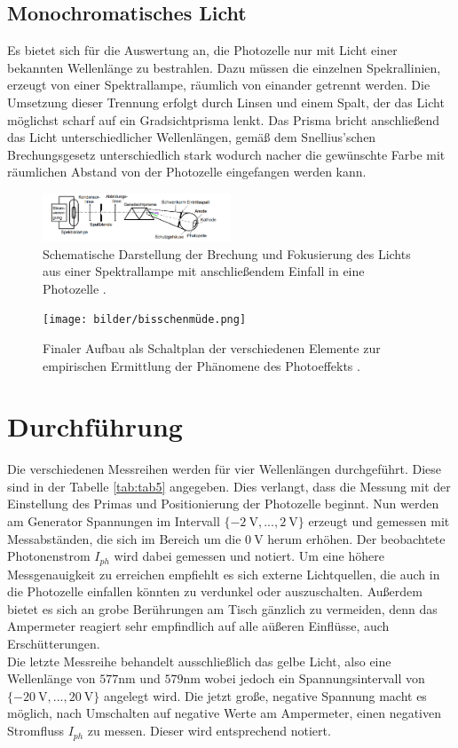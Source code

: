 \subsection{Monochromatisches Licht}
Es bietet sich für die Auswertung an, die Photozelle nur mit Licht einer bekannten Wellenlänge zu bestrahlen.
Dazu müssen die einzelnen Spekrallinien, erzeugt von einer Spektrallampe, räumlich von einander getrennt werden. 
Die Umsetzung dieser Trennung erfolgt durch Linsen und einem Spalt, der das Licht möglichst scharf auf ein Gradsichtprisma lenkt.
Das Prisma bricht anschließend das Licht unterschiedlicher Wellenlängen, gemäß dem Snellius'schen Brechungsgesetz unterschiedlich 
stark wodurch nacher die gewünschte Farbe mit räumlichen Abstand von der Photozelle eingefangen werden kann.
\begin{figure}
    \centering
    \includegraphics[width=0.5\textwidth]{bilder/licht.png}
    \caption{Schematische Darstellung der Brechung und Fokusierung des Lichts aus einer Spektrallampe mit anschließendem Einfall in eine Photozelle \cite{skript}.} 
    \label{fig:müde}
\end{figure}

\begin{figure}
    \centering
    \texttt{[image: bilder/bisschenmüde.png]}
    \caption{Finaler Aufbau als Schaltplan der verschiedenen Elemente zur empirischen Ermittlung der Phänomene des Photoeffekts \cite{skript}.} 
    \label{fig:müde}
\end{figure}
\section{Durchführung}
Die verschiedenen Messreihen werden für vier Wellenlängen durchgeführt. Diese sind in der Tabelle \ref{tab:tab5} angegeben. %
Dies verlangt, dass die Messung mit der Einstellung des Primas und Positionierung der Photozelle beginnt. 
Nun werden am Generator Spannungen im Intervall $\{\SI{-2}{\volt},... ,\SI{2}{\volt}\}$ erzeugt und gemessen mit Messabständen, die sich im Bereich um die $\SI{0}{\volt}$ herum erhöhen.
Der beobachtete Photonenstrom $I_{ph}$ wird dabei gemessen und notiert. Um eine höhere Messgenauigkeit zu erreichen empfiehlt es sich externe Lichtquellen, die
auch in die Photozelle einfallen könnten zu verdunkel oder auszuschalten. Außerdem bietet es sich an grobe Berührungen am Tisch gänzlich zu vermeiden, 
denn das Ampermeter reagiert sehr empfindlich auf alle aüßeren Einflüsse, auch Erschütterungen.
\\
\newline
Die letzte Messreihe behandelt ausschließlich das gelbe Licht, also eine Wellenlänge von $577\si{\nano\meter}$ und $579 \si{\nano\meter}$ wobei jedoch ein 
Spannungsintervall von $\{\SI{-20}{\volt},... ,\SI{20}{\volt}\}$ angelegt wird. Die jetzt große, negative Spannung macht es möglich, nach Umschalten auf negative Werte am Ampermeter,
einen negativen Stromfluss $I_{ph}$ zu messen. Dieser wird entsprechend notiert. 
